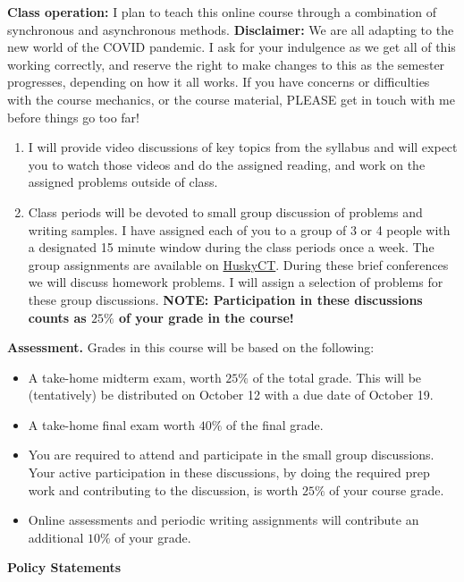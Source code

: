 \documentclass[12pt]{article}
\begin{document}
{\bf Class operation:} I plan to teach this online course through a combination of synchronous and asynchronous
methods.  {\bf Disclaimer:}  We are all adapting to the new world of the COVID pandemic.  I ask for your indulgence
as we get all of this working correctly, and reserve the right to make changes to this as the semester
progresses, depending on how it all works. If you have concerns or difficulties with the course
    mechanics, or the course material, PLEASE get in touch with me before things go too far!  
\begin{enumerate}
  \item I will provide video discussions of key topics from the syllabus and will expect you to watch those
    videos and do the assigned reading, and work on the assigned problems outside of class.
  \item Class periods will be devoted to small group discussion of problems
    and writing samples.  I have assigned each of you to a group of 3 or 4 people with a designated
    15 minute window during the class periods once a week.  The group assignments are available
    on \href{http://huckyct.uconn.edu}{HuskyCT}.  During these brief conferences we will discuss
    homework problems.  I will assign a selection of problems for these group discussions.
    {\bf NOTE: Participation in these discussions counts as $25\%$ of your grade in the course!}
\end{enumerate}

{\bf Assessment.}  Grades in this course will be based on the
following:
\begin{itemize}
\item A take-home midterm exam,  worth $25\%$ of the total grade.  This will be (tentatively)
  be distributed on October 12 with a due date of October 19.
\item A take-home final exam worth $40\%$ of the final grade.
\item You are required to attend and participate in the small group discussions.  Your active participation
  in these discussions, by doing the required prep work and contributing to the discussion, is worth
  $25\%$ of your course grade.
\item Online assessments and periodic writing assignments will contribute an additional $10\%$ of your grade.
\end{itemize}


\vfill\eject
\begin{center}

{\bf\Large Policy Statements}

\end{center}
\end{document}
